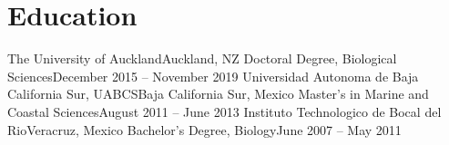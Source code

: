\section{Education}
\resumeSubHeadingList
\resumeSubheading
      {The University of Auckland}{Auckland, NZ}
      {Doctoral Degree, Biological Sciences}{December 2015 -- November 2019}
\resumeSubheading
      {Universidad Autonoma de Baja California Sur, UABCS}{Baja California Sur, Mexico}
      {Master's in Marine and Coastal Sciences}{August 2011 -- June 2013}
\resumeSubheading
      {Instituto Technologico de Bocal del Rio}{Veracruz, Mexico}
      {Bachelor's Degree, Biology}{June 2007 -- May 2011}
\resumeSubHeadingListEnd